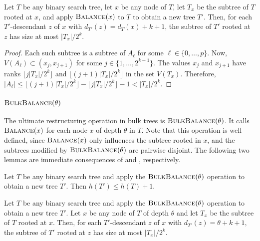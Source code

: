 \documentclass[kpfonts]{patmorin}
\let\le\leqslant
\begin{document}
\begin{lem}
  Let $T$ be any binary search tree, let $x$ be any node of $T$, let $T_x$ be the subtree of $T$ rooted at $x$, and apply $\textsc{Balance}(x)$ to $T$ to obtain a new tree $T'$.  Then, for each $T'$-descendant $z$ of $x$ with $d_{T'}(z)=d_{T}(x)+k+1$, the subtree of $T'$ rooted at $z$ has size at most $|T_x|/2^k$.
\end{lem}

\begin{proof}
  Each such subtree is a subtree of $A_\ell$ for some $\ell\in\{0,\ldots,p\}$. Now, $V(A_\ell)\subset (x_j,x_{j+1})$ for some $j\in\{1,\ldots,2^{k-1}\}$.  The values $x_j$ and $x_{j+1}$ have ranks $\lfloor j|T_x|/2^k\rfloor$ and $\lfloor (j+1)|T_x|/2^k\rfloor$ in the set $V(T_x)$.  Therefore, $|A_\ell|\le \lfloor (j+1)|T_x|/2^k\rfloor- \lfloor j|T_x|/2^k\rfloor -1 < |T_x|/2^k$.
\end{proof}

\subsubsection{$\textsc{BulkBalance}(\theta)$}

The ultimate restructuring operation in bulk trees is $\textsc{BulkBalance}(\theta)$.
It calls $\textsc{Balance}(x)$ for each node $x$ of depth $\theta$ in $T$. Note that this operation is well defined, since $\textsc{Balance}(x)$ only influences the subtree rooted in $x$, and the subtrees modified by $\textsc{BulkBalance}(\theta)$ are pairwise disjoint.
The following two lemmas are immediate consequences of  and , respectively.

\begin{lem}
  Let $T$ be any binary search tree and apply the $\textsc{BulkBalance}(\theta)$ operation to obtain a new tree $T'$.  Then $h(T')\le h(T)+1$.
\end{lem}

\begin{lem}
  Let $T$ be any binary search tree and apply the $\textsc{BulkBalance}(\theta)$ operation to obtain a new tree $T'$.  
  Let $x$ be any node of $T$ of depth $\theta$ and let $T_x$ be the subtree of $T$ rooted at $x$.   
  Then, for each $T'$-descendant $z$ of $x$ with $d_{T'}(z)=\theta+k+1$, the subtree of $T'$ rooted at $z$ has size at most $|T_x|/2^k$. 
\end{lem}
\end{document}
